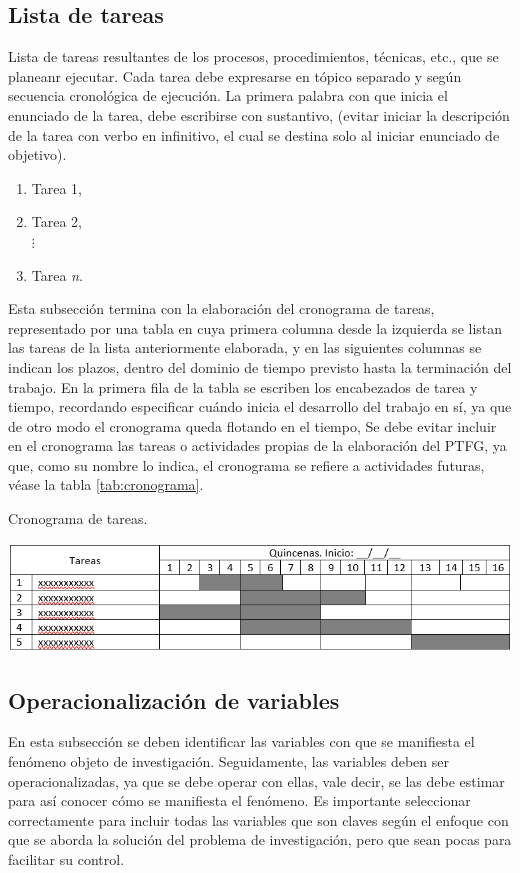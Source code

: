\documentclass[12pt,a4paper]{article}
\begin{document}
\subsection{Lista de tareas}
Lista de tareas resultantes de los procesos, procedimientos, técnicas, etc., que se planeanr ejecutar. Cada tarea debe expresarse en tópico separado y según secuencia cronológica de ejecución. La primera palabra con que inicia el enunciado de la tarea, debe escribirse con sustantivo, (evitar iniciar la descripción de la tarea con verbo en infinitivo, el cual se destina solo al iniciar enunciado de objetivo).

\begin{enumerate}
\item Tarea 1,
\item Tarea 2,\\ 
$ \vdots $
\item Tarea \textit{n}.
\end{enumerate}

Esta subsección termina con la elaboración del cronograma de tareas, representado por una tabla en cuya primera columna desde la izquierda se listan las tareas de la lista anteriormente elaborada, y en las siguientes columnas se indican los plazos, dentro del dominio de tiempo previsto hasta la terminación del trabajo. En la primera fila de la tabla se escriben los encabezados de tarea y tiempo, recordando especificar cuándo inicia el desarrollo del trabajo en sí, ya que de otro modo el cronograma queda flotando en el tiempo, Se debe evitar incluir en el cronograma las tareas o actividades propias de la elaboración del PTFG, ya que, como su nombre lo indica, el cronograma se refiere a actividades futuras, véase la tabla \ref{tab:cronograma}. 
\begin{center}
\begin{table}[H]
\begin{center}
\caption{Cronograma de tareas. \label{tab:cronograma}}
\includegraphics[scale=.8]{./crono_tareas}
\end{center}
\end{table}
\end{center}

\subsection{Operacionalización de variables}
En esta subsección se deben identificar las variables con que se manifiesta el fenómeno objeto de investigación. Seguidamente, las variables deben ser operacionalizadas, ya que se debe operar con ellas, vale decir, se las debe estimar para así conocer cómo se manifiesta el fenómeno. Es importante seleccionar correctamente para incluir todas las variables que son claves según el enfoque con que se aborda la solución del problema de investigación, pero que sean pocas para facilitar su control.
\end{document}
